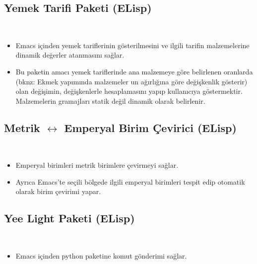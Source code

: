 \documentclass[a4paper, 9pt]{extarticle}
\begin{document}
\subsection{Yemek Tarifi Paketi (ELisp)} \label{lisp:frp} \hfill \\
\begin{itemize}
	\item Emacs içinden yemek tariflerinin gösterilmesini ve ilgili tarifin
	malzemelerine dinamik değerler atanmasını sağlar.
	\item Bu paketin amacı yemek tariflerinde ana malzemeye göre belirlenen
	oranlarda (bknz: Ekmek yapımında malzemeler un ağırlığına göre değişkenlik
	gösterir) olan değişimin, değişkenlerle hesaplamasını yapıp kullanıcıya
	göstermektir. Malzemelerin gramajları statik değil dinamik olarak belirlenir.
\end{itemize}

\subsection{Metrik $\longleftrightarrow$ Emperyal Birim Çevirici (ELisp)}
\hfill \\
\begin{itemize}
	\item Emperyal birimleri metrik birimlere çevirmeyi sağlar.
	\item Ayrıca Emacs'te seçili bölgede ilgili emperyal birimleri tespit edip
	otomatik olarak birim çevirimi yapar.
\end{itemize}


\subsection{Yee Light Paketi (ELisp)} \hfill \\
\begin{itemize}
	\item Emacs içinden  python paketine komut gönderimi sağlar.
\end{itemize}
\end{document}
